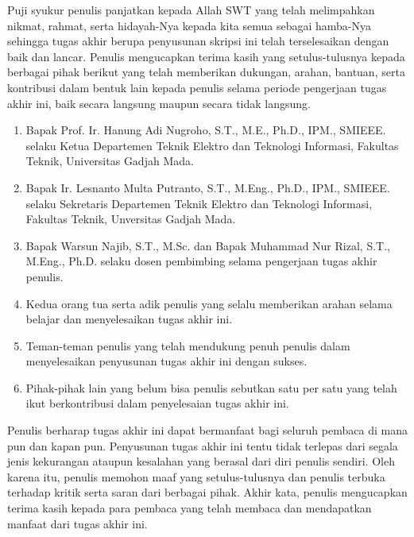 Puji syukur penulis panjatkan kepada Allah SWT yang telah melimpahkan nikmat, rahmat, serta hidayah-Nya kepada kita semua sebagai hamba-Nya sehingga tugas akhir berupa penyusunan skripsi ini telah terselesaikan dengan baik dan lancar. Penulis mengucapkan terima kasih yang setulus-tulusnya kepada berbagai pihak berikut yang telah memberikan dukungan, arahan, bantuan, serta kontribusi dalam bentuk lain kepada penulis selama periode pengerjaan tugas akhir ini, baik secara langsung maupun secara tidak langsung.

\begin{enumerate}
	\item Bapak Prof. Ir. Hanung Adi Nugroho, S.T., M.E., Ph.D., IPM., SMIEEE. selaku Ketua Departemen Teknik Elektro dan Teknologi Informasi, Fakultas Teknik, Universitas Gadjah Mada.
 
	\item Bapak Ir. Lesnanto Multa Putranto, S.T., M.Eng., Ph.D., IPM., SMIEEE. selaku Sekretaris Departemen Teknik Elektro dan Teknologi Informasi, Fakultas Teknik, Unversitas Gadjah Mada.
 
        \item Bapak Warsun Najib, S.T., M.Sc. dan Bapak Muhammad Nur Rizal, S.T., M.Eng., Ph.D. selaku dosen pembimbing selama pengerjaan tugas akhir penulis.
	
	\item Kedua orang tua serta adik penulis yang selalu memberikan arahan selama belajar dan menyelesaikan tugas akhir ini.

        \item Teman-teman penulis yang telah mendukung penuh penulis dalam menyelesaikan penyusunan tugas akhir ini dengan sukses.

        \item Pihak-pihak lain yang belum bisa penulis sebutkan satu per satu yang telah ikut berkontribusi dalam penyelesaian tugas akhir ini.
\end{enumerate}

Penulis berharap tugas akhir ini dapat bermanfaat bagi seluruh pembaca di mana pun dan kapan pun. Penyusunan tugas akhir ini tentu tidak terlepas dari segala jenis kekurangan ataupun kesalahan yang berasal dari diri penulis sendiri. Oleh karena itu, penulis memohon maaf yang setulus-tulusnya dan penulis terbuka terhadap kritik serta saran dari berbagai pihak. Akhir kata, penulis mengucapkan terima kasih kepada para pembaca yang telah membaca dan mendapatkan manfaat dari tugas akhir ini.
